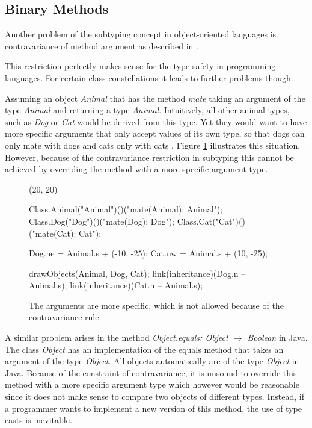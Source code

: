 \subsection{Binary Methods}
\label{sec:recursiveClosure}
 Another problem of the subtyping concept in
object-oriented languages is contravariance of method argument as described in 
.

This restriction perfectly makes sense for the type safety in programming
languages. For certain class constellations it leads to further problems
though.

Assuming an object \emph{Animal} that has the method \emph{mate}
taking an argument of the type \emph{Animal} and returning a type
\emph{Animal}. Intuitively, all other animal types, such as \emph{Dog} or
\emph{Cat} would be derived from this type. Yet they would want to have more specific
arguments that only accept values of its own type, so that dogs can only
mate with dogs and cats only with cats \cite{simons_theory_2003-1}. Figure
\ref{fig:animalContravariance} illustrates this situation. However,
because of the contravariance restriction in subtyping this cannot be
achieved by overriding the method with a more specific argument type.

\begin{figure}[H]
	\centering
	\begin{emp}[classdiag](20, 20)

		Class.Animal("Animal")()("mate(Animal): Animal");
		Class.Dog("Dog")()("mate(Dog): Dog");
		Class.Cat("Cat")()("mate(Cat): Cat");

		Dog.ne = Animal.s + (-10, -25);
		Cat.nw = Animal.s + (10, -25);

		drawObjects(Animal, Dog, Cat);
		link(inheritance)(Dog.n -- Animal.s);
		link(inheritance)(Cat.n -- Animal.s);

	\end{emp}
	\caption[More specific arguments]{The arguments are more specific, which is not allowed because of the contravariance rule.}
	\label{fig:animalContravariance}
\end{figure}

A similar problem arises in the method \emph{Object.equals: Object
$\rightarrow$ Boolean} in Java. The class \emph{Object} has an
implementation of the equals method that takes an argument of the type
\emph{Object}. All objects automatically are of the type \emph{Object}
in Java. Because of the constraint of contravariance, it is unsound
to override this method with a more specific argument type which however would
be reasonable since it does not make sense to compare two objects
of different types. Instead, if a programmer wants to implement a new
version of this method, the use of type casts is inevitable.

